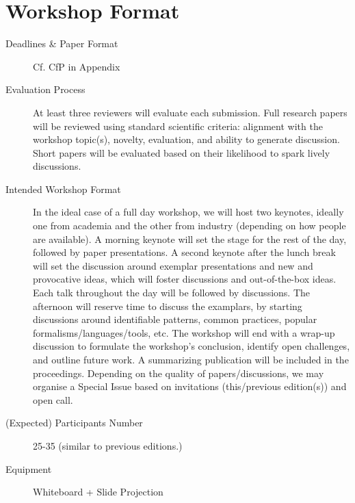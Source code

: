 \section{Workshop Format}
\label{sec:Format}

\begin{description}
   \item[Deadlines \& Paper Format] Cf. CfP in Appendix
   
   \item[Evaluation Process] At least three reviewers will evaluate each submission.
   Full research papers will be reviewed using standard scientific criteria: alignment 
   with the workshop topic(s), novelty, evaluation, and ability to generate discussion.
   Short papers will be evaluated based on their likelihood to spark lively 
   discussions.

   \item[Intended Workshop Format] In the ideal case of a full day workshop, we 
   will host two keynotes, ideally one from academia and the other from industry
   (depending on how people are available). 
   A morning keynote will set the stage for the rest of the day, followed by 
   paper presentations. A second keynote after the lunch break will set the 
   discussion around exemplar presentations and new and provocative ideas,
   which will foster discussions and out-of-the-box ideas. Each talk throughout the
   day will be followed by discussions.
   The afternoon will reserve time to discuss the examplars, by starting discussions
   around identifiable patterns, common practices, popular formalisms/languages/tools, etc. 
   The workshop will end with a wrap-up discussion to formulate the workshop's 
   conclusion, identify open challenges, and outline future work.
   A summarizing publication will be included in the proceedings. 
   Depending on the quality of papers/discussions, we may organise a Special Issue
   based on invitations (this/previous edition(s)) and open call.
   
   \item[(Expected) Participants Number] 25-35 (similar to previous editions.)
   
   \item[Equipment] Whiteboard + Slide Projection
\end{description}

